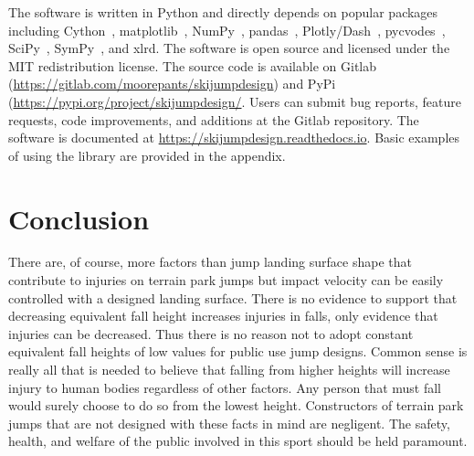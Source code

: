 \documentclass{article}
\begin{document}
The software is written in Python and directly depends on popular packages
including Cython~\cite{Behnel2011}, matplotlib~\cite{Hunter2007},
NumPy~\cite{Oliphant2006}, pandas~\cite{McKinney2020},
Plotly/Dash~\cite{Plotly2015}, pycvodes~\cite{Dahlgren2018},
SciPy~\cite{Virtanen2020}, SymPy~\cite{Meurer2017}, and xlrd.  The software is
open source and licensed under the MIT redistribution license.  The source code
is available on Gitlab (\url{https://gitlab.com/moorepants/skijumpdesign}) and
PyPi (\url{https://pypi.org/project/skijumpdesign/}. Users can submit bug
reports, feature requests, code improvements, and additions at the Gitlab
repository. The software is documented at
\href{https://skijumpdesign.readthedocs.io}{https://skijumpdesign.readthedocs.io}.
Basic examples of using the library are provided in the appendix.

\section{Conclusion}
%
There are, of course, more factors than jump landing surface shape that
contribute to injuries on terrain park jumps but impact velocity can be easily
controlled with a designed landing surface. There is no evidence to support
that decreasing equivalent fall height increases injuries in falls, only
evidence that injuries can be decreased. Thus there is no reason not to adopt
constant equivalent fall heights of low values for public use jump designs.
Common sense is really all that is needed to believe that falling from higher
heights will increase injury to human bodies regardless of other factors. Any
person that must fall would surely choose to do so from the lowest height.
Constructors of terrain park jumps that are not designed with these facts in
mind are negligent. The safety, health, and welfare of the public involved in
this sport should be held paramount.





\appendix
\end{document}
